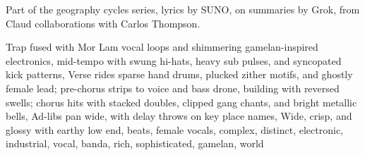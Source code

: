 
\begin{notes}
Part of the geography cycles series, lyrics by SUNO, on summaries by Grok, from Claud collaborations with Carlos Thompson.
\end{notes}
\begin{style}
Trap fused with Mor Lam vocal loops and shimmering gamelan-inspired electronics, mid-tempo with swung hi-hats, heavy sub pulses, and syncopated kick patterns, Verse rides sparse hand drums, plucked zither motifs, and ghostly female lead; pre-chorus strips to voice and bass drone, building with reversed swells; chorus hits with stacked doubles, clipped gang chants, and bright metallic bells, Ad-libs pan wide, with delay throws on key place names, Wide, crisp, and glossy with earthy low end, beats, female vocals, complex, distinct, electronic, industrial, vocal, banda, rich, sophisticated, gamelan, world
\end{style}
